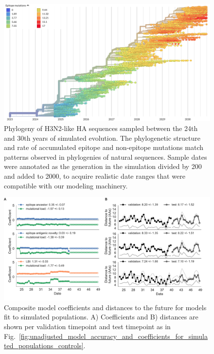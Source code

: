 \begin{figure}[H]
  \begin{center}
  \includegraphics[width=\textwidth]{figures/simulated-h3n2-ha-phylogeny.png}
  \caption{
  Phylogeny of H3N2-like HA sequences sampled between the 24th and 30th years of simulated evolution.
  The phylogenetic structure and rate of accumulated epitope and non-epitope mutations match patterns observed in phylogenies of natural sequences.
  Sample dates were annotated as the generation in the simulation divided by 200 and added to 2000, to acquire realistic date ranges that were compatible with our modeling machinery.
  }
  \label{sup_fig:simulated_h3n2_ha_phylogeny}
  \end{center}
\end{figure}

\begin{figure}[H]
  \begin{center}
  \includegraphics[width=\textwidth]{figures/unadjusted-composite-model-accuracy-and-coefficients-for-simulated-populations.pdf}
  \caption{
  Composite model coefficients and distances to the future for models fit to simulated populations.
  A) Coefficients and B) distances are shown per validation timepoint and test timepoint as in Fig.~\ref{fig:unadjusted_model_accuracy_and_coefficients_for_simulated_populations_controls}.
  }
  \label{sup_fig:unadjusted_composite_model_accuracy_and_coefficients_for_simulated_populations}
  \end{center}
\end{figure}

